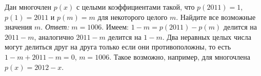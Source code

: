 \problem
Дан многочлен $p(x)$ с целыми коэффициентами такой, что
$p(2011) = 1$, $p(1) = 2011$ и $p(m) = m$ для некоторого целого $m$.
Найдите все возможные значения $m$.
\solution
\emph{Ответ:} $m = 1006$.
Имеем: $1 - m = p(2011) - p(m)$ делится на $2011 - m$, аналогично $2011 - m$
делится на $1 - m$.
Два неравных целых числа могут делиться друг на друга только если они
противоположны, то есть $1 - m + 2011 - m = 0$, $m = 1006$.
Такое возможно, например, для многочлена $p(x) = 2012 - x$.
\endproblem
